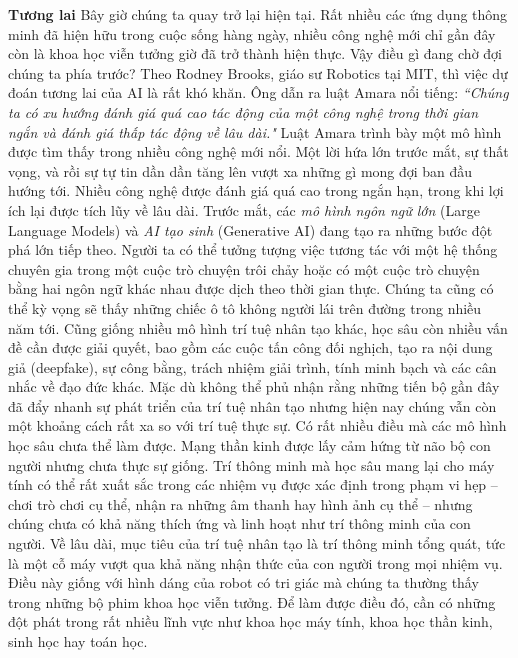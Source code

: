 \begin{multicols}{2}
	\vskip 0.1cm
	\textbf{\color{cackithi}Tương lai}
	\vskip 0.1cm
	Bây giờ chúng ta quay trở lại hiện tại. Rất nhiều các ứng dụng thông minh đã hiện hữu trong cuộc sống hàng ngày, nhiều công nghệ mới chỉ gần đây còn là khoa học viễn tưởng giờ đã trở thành hiện thực. Vậy điều gì đang chờ đợi chúng ta phía trước?
	\vskip 0.1cm
	Theo Rodney Brooks, giáo sư Robotics tại MIT, thì việc dự đoán tương lai của AI là rất khó khăn. Ông dẫn ra luật Amara nổi tiếng:
	\textit{``Chúng ta có xu hướng đánh giá quá cao tác động của một công nghệ trong thời gian ngắn và đánh giá thấp tác động về lâu dài."}
	Luật Amara trình bày một mô hình được tìm thấy trong nhiều công nghệ mới nổi. Một lời hứa lớn trước mắt, sự thất vọng, và rồi sự tự tin dần dần tăng lên vượt xa những gì mong đợi ban đầu hướng tới. Nhiều công nghệ được đánh giá quá cao trong ngắn hạn, trong khi lợi ích lại được tích lũy về lâu dài. 
	\vskip 0.1cm
	Trước mắt, các \textit{mô hình ngôn ngữ lớn} (Large Language Models) và \textit{AI tạo sinh} (Generative AI) đang tạo ra những bước đột phá lớn tiếp theo. Người ta có thể tưởng tượng việc tương tác với một hệ thống chuyên gia trong một cuộc trò chuyện trôi chảy hoặc có một cuộc trò chuyện bằng hai ngôn ngữ khác nhau được dịch theo thời gian thực. Chúng ta cũng có thể kỳ vọng sẽ thấy những chiếc ô tô không người lái trên đường trong nhiều năm tới.
	\vskip 0.1cm
	Cũng giống nhiều mô hình trí tuệ nhân tạo khác, học sâu còn nhiều vấn đề cần được giải quyết, bao gồm các cuộc tấn công đối nghịch, tạo ra nội dung giả (deepfake), sự công bằng, trách nhiệm giải trình, tính minh bạch và các cân nhắc về đạo đức khác.
	\vskip 0.1cm
	Mặc dù không thể phủ nhận rằng những tiến bộ gần đây đã đẩy nhanh sự phát triển của trí tuệ nhân tạo nhưng hiện nay chúng vẫn còn một khoảng cách rất xa so với trí tuệ thực sự. Có rất nhiều điều mà các mô hình học sâu chưa thể làm được. Mạng thần kinh được lấy cảm hứng từ não bộ con người nhưng chưa thực sự giống. Trí thông minh mà học sâu mang lại cho máy tính có thể rất xuất sắc trong các nhiệm vụ được xác định trong phạm vi hẹp -- chơi trò chơi cụ thể, nhận ra những âm thanh hay hình ảnh cụ thể  -- nhưng chúng chưa có khả năng thích ứng và linh hoạt như trí thông minh của con người. Về lâu dài, mục tiêu của trí tuệ nhân tạo là trí thông minh tổng quát, tức là một cỗ máy vượt qua khả năng nhận thức của con người trong mọi nhiệm vụ. Điều này giống với hình dáng của robot có tri giác mà chúng ta thường thấy trong những bộ phim khoa học viễn tưởng. Để làm được điều đó, cần có những đột phát trong rất nhiều lĩnh vực như khoa học máy tính, khoa học thần kinh, sinh học hay toán học. 

\end{multicols}

